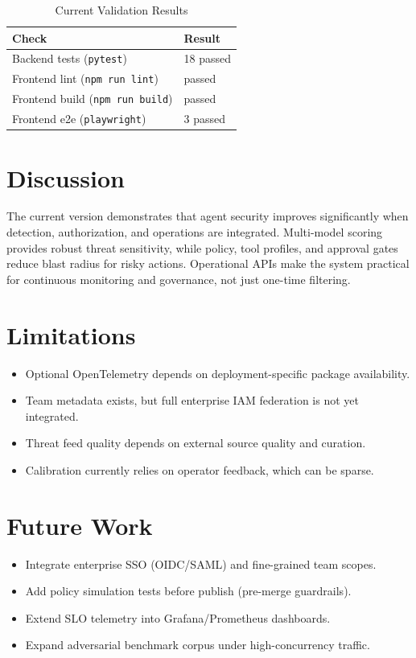 \documentclass[conference]{IEEEtran}
\begin{document}
\begin{table}[h]
\centering
\caption{Current Validation Results}
\label{tab:validation}
\begin{tabular}{>{\raggedright\arraybackslash}p{3.0cm}p{3.7cm}}
\toprule
\textbf{Check} & \textbf{Result} \\
\midrule
Backend tests (\texttt{pytest}) & 18 passed \\
Frontend lint (\texttt{npm run lint}) & passed \\
Frontend build (\texttt{npm run build}) & passed \\
Frontend e2e (\texttt{playwright}) & 3 passed \\
\bottomrule
\end{tabular}
\end{table}

\section{Discussion}
The current version demonstrates that agent security improves significantly when detection, authorization, and operations are integrated. Multi-model scoring provides robust threat sensitivity, while policy, tool profiles, and approval gates reduce blast radius for risky actions. Operational APIs make the system practical for continuous monitoring and governance, not just one-time filtering.

\section{Limitations}
\begin{itemize}
    \item Optional OpenTelemetry depends on deployment-specific package availability.
    \item Team metadata exists, but full enterprise IAM federation is not yet integrated.
    \item Threat feed quality depends on external source quality and curation.
    \item Calibration currently relies on operator feedback, which can be sparse.
\end{itemize}

\section{Future Work}
\begin{itemize}
    \item Integrate enterprise SSO (OIDC/SAML) and fine-grained team scopes.
    \item Add policy simulation tests before publish (pre-merge guardrails).
    \item Extend SLO telemetry into Grafana/Prometheus dashboards.
    \item Expand adversarial benchmark corpus under high-concurrency traffic.
\end{itemize}
\end{document}
